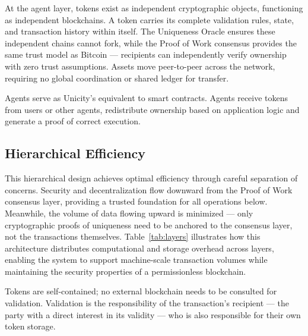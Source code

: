 \documentclass{article}
\begin{document}
At the agent layer, tokens exist as independent cryptographic objects, functioning as independent blockchains. A token carries its complete validation rules, state, and transaction history within itself. The Uniqueness Oracle ensures these independent chains cannot fork, while the Proof of Work consensus provides the same trust model as Bitcoin --- recipients can independently verify ownership with zero trust assumptions. Assets move peer-to-peer across the network, requiring no global coordination or shared ledger for transfer.

Agents serve as Unicity's equivalent to smart contracts. Agents receive tokens from users or other agents, redistribute ownership based on application logic and generate a proof of correct execution.

\subsection{Hierarchical Efficiency}

This hierarchical design achieves optimal efficiency through careful separation of concerns. Security and decentralization flow downward from the Proof of Work consensus layer, providing a trusted foundation for all operations below. Meanwhile, the volume of data flowing upward is minimized --- only cryptographic proofs of uniqueness need to be anchored to the consensus layer, not the transactions themselves. Table~\ref{tab:layers} illustrates how this architecture distributes computational and storage overhead across layers, enabling the system to support machine-scale transaction volumes while maintaining the security properties of a permissionless blockchain.

Tokens are self-contained; no external blockchain needs to be consulted for validation. Validation is the responsibility of the transaction's recipient --- the party with a direct interest in its validity --- who is also responsible for their own token storage.
\end{document}
